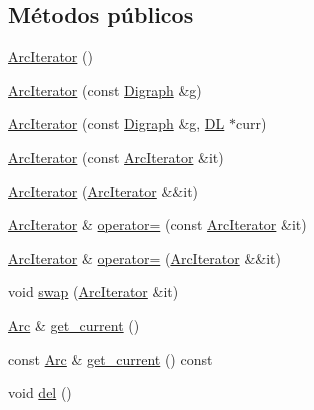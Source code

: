 \subsection*{Métodos públicos}
\begin{DoxyCompactItemize}
\item 
\hyperlink{class_designar_1_1_digraph_1_1_arc_iterator_a0f540c556301e1d4e0a9d48433257b89}{Arc\+Iterator} ()
\item 
\hyperlink{class_designar_1_1_digraph_1_1_arc_iterator_ac16db42766a60aa488fb4db5492c1361}{Arc\+Iterator} (const \hyperlink{class_designar_1_1_digraph}{Digraph} \&g)
\item 
\hyperlink{class_designar_1_1_digraph_1_1_arc_iterator_ae4a8b9172d19134e71693734003ee350}{Arc\+Iterator} (const \hyperlink{class_designar_1_1_digraph}{Digraph} \&g, \hyperlink{class_designar_1_1_d_l}{DL} $\ast$curr)
\item 
\hyperlink{class_designar_1_1_digraph_1_1_arc_iterator_a78fe9751892ba8eaa56aaba4a176666c}{Arc\+Iterator} (const \hyperlink{class_designar_1_1_digraph_1_1_arc_iterator}{Arc\+Iterator} \&it)
\item 
\hyperlink{class_designar_1_1_digraph_1_1_arc_iterator_acb84eb022d5113512f9c272dc47fd2da}{Arc\+Iterator} (\hyperlink{class_designar_1_1_digraph_1_1_arc_iterator}{Arc\+Iterator} \&\&it)
\item 
\hyperlink{class_designar_1_1_digraph_1_1_arc_iterator}{Arc\+Iterator} \& \hyperlink{class_designar_1_1_digraph_1_1_arc_iterator_a6a048ab6882106fc0d433a7c9fab297f}{operator=} (const \hyperlink{class_designar_1_1_digraph_1_1_arc_iterator}{Arc\+Iterator} \&it)
\item 
\hyperlink{class_designar_1_1_digraph_1_1_arc_iterator}{Arc\+Iterator} \& \hyperlink{class_designar_1_1_digraph_1_1_arc_iterator_a0ac762b04a286813cbed33857996c7cb}{operator=} (\hyperlink{class_designar_1_1_digraph_1_1_arc_iterator}{Arc\+Iterator} \&\&it)
\item 
void \hyperlink{class_designar_1_1_digraph_1_1_arc_iterator_a73ca00e5bcc478168ae16a73149becb1}{swap} (\hyperlink{class_designar_1_1_digraph_1_1_arc_iterator}{Arc\+Iterator} \&it)
\item 
\hyperlink{class_designar_1_1_digraph_a0ceb278671f2a535c00fddccdeafd69f}{Arc} \& \hyperlink{class_designar_1_1_digraph_1_1_arc_iterator_af7734cd84a4dd523f276064833abaa85}{get\+\_\+current} ()
\item 
const \hyperlink{class_designar_1_1_digraph_a0ceb278671f2a535c00fddccdeafd69f}{Arc} \& \hyperlink{class_designar_1_1_digraph_1_1_arc_iterator_a665f22163e2cc026f0b95f964ae6e048}{get\+\_\+current} () const
\item 
void \hyperlink{class_designar_1_1_digraph_1_1_arc_iterator_aa4f42b888685025c5c3f2e730df4eb36}{del} ()
\end{DoxyCompactItemize}
